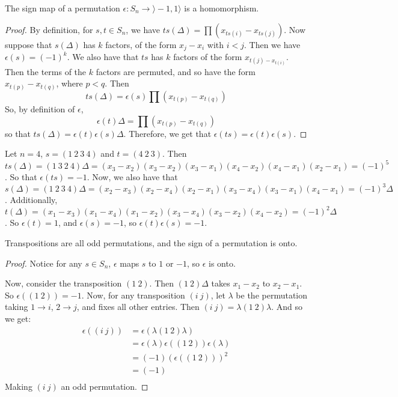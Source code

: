 \begin{lemma}\label{lemma_3.6.2}
  The sign map of a permutation $\epsilon:S_n \rightarrow \rangle -1,1
  \rangle$ is a homomorphism.
\end{lemma}
\begin{proof}
  By definition, for $s,t \in S_n$, we have
  $ts(\Delta)=\prod{(x_{ts(i)}-x_{ts(j)})}$. Now suppose that $s(\Delta)$ has
  $k$ factors, of the form  $x_j-x_i$ with  $i<j$. Then we have
  $\epsilon(s)=(-1)^k$. We also have that $ts$ has  $k$ factors of the form
  $x_{t(j)-x_{t(i)}}$. Then the terms of the $k$ factors are permuted, and so
  have the form $x_{t(p)}-x_{t(q)}$, where $p<q$. Then
  \begin{equation*}
    ts(\Delta)=\epsilon(s)\prod{(x_{t(p)}-x_{t(q)})}
  \end{equation*}
  So, by definition of $\epsilon$,
  \begin{equation*}
    \epsilon(t)\Delta=\prod{(x_{t(p)}-x_{t(q)})}
  \end{equation*}
  so that $ts(\Delta)=\epsilon(t)\epsilon(s)\Delta$. Therefore, we get that
  $\epsilon(ts)=\epsilon(t)\epsilon(s)$.
\end{proof}

\begin{example}\label{example_3.13}
  Let $n=4$, $s=(1 \ 2 \ 3 \ 4)$ and  $t=(4 \ 2 \ 3)$. Then $ts(\Delta)=(1 \ 3
  \ 2 \ 4)\Delta=(x_3-x_2)(x_3-x_2)(x_3-x_1)(x_4-x_2)(x_4-x_1)(x_2-x_1)=(-1)^5$.
  So that $\epsilon(ts)=-1$. Now, we also have that $s(\Delta)=(1 \ 2 \ 3 \
  4)\Delta=(x_2-x_3)(x_2-x_4)(x_2-x_1)(x_3-x_4)(x_3-x_1)(x_4-x_1)=(-1)^3\Delta$.
  Additionally,
  $t(\Delta)=(x_1-x_3)(x_1-x_4)(x_1-x_2)(x_3-x_4)(x_3-x_2)(x_4-x_2)=(-1)^2\Delta$.
  So $\epsilon(t)=1$, and $\epsilon(s)=-1$, so $\epsilon(t)\epsilon(s)=-1$.
\end{example}

\begin{theorem}\label{theorem_3.6.3}
  Transpositions are all odd permutations, and the sign of a permutation is
  onto.
\end{theorem}
\begin{proof}
  Notice for any $s \in S_n$,  $\epsilon$ maps  $s$ to  $1$ or  $-1$, so
  $\epsilon$ is onto.

  Now, consider the transposition  $(1 \ 2)$. Then $(1 \ 2)\Delta$ takes
  $x_1-x_2$ to $x_2-x_1$. So $\epsilon((1 \ 2))=-1$. Now, for any
  transposition $(i \ j)$, let $\lambda$ be the permutation taking  $1
  \rightarrow i$, $2 \rightarrow j$, and fixes all other entries. Then $(i \
  j)=\lambda(1 \ 2)\lambda$. And so we get:
  \begin{align*}
    \epsilon((i \ j))       &=      \epsilon(\lambda(1 \ 2)\lambda)     \\
                            &=      \epsilon(\lambda)\epsilon((1 \ 2))\epsilon(\lambda) \\
                            &= (-1)(\epsilon((1 \ 2)))^2        \\
                            &= (-1)                     \\
  \end{align*}
  Making $(i \ j)$ an odd permutation.
\end{proof}

